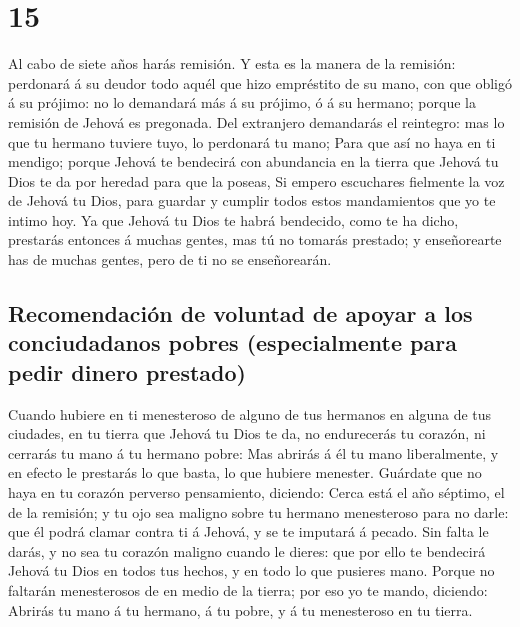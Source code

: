 \hypertarget{section-14}{%
\section{15}\label{section-14}}

 Al cabo de siete años harás remisión.  Y
esta es la manera de la remisión: perdonará á su deudor todo aquél que
hizo empréstito de su mano, con que obligó á su prójimo: no lo demandará
más á su prójimo, ó á su hermano; porque la remisión de Jehová es
pregonada.  Del extranjero demandarás el reintegro: mas lo
que tu hermano tuviere tuyo, lo perdonará tu mano;  Para
que así no haya en ti mendigo; porque Jehová te bendecirá con abundancia
en la tierra que Jehová tu Dios te da por heredad para que la poseas,
 Si empero escuchares fielmente la voz de Jehová tu Dios,
para guardar y cumplir todos estos mandamientos que yo te intimo hoy.
 Ya que Jehová tu Dios te habrá bendecido, como te ha
dicho, prestarás entonces á muchas gentes, mas tú no tomarás prestado; y
enseñorearte has de muchas gentes, pero de ti no se enseñorearán.

\hypertarget{recomendaciuxf3n-de-voluntad-de-apoyar-a-los-conciudadanos-pobres-especialmente-para-pedir-dinero-prestado}{%
\subsection{Recomendación de voluntad de apoyar a los conciudadanos
pobres (especialmente para pedir dinero
prestado)}\label{recomendaciuxf3n-de-voluntad-de-apoyar-a-los-conciudadanos-pobres-especialmente-para-pedir-dinero-prestado}}

 Cuando hubiere en ti menesteroso de alguno de tus
hermanos en alguna de tus ciudades, en tu tierra que Jehová tu Dios te
da, no endurecerás tu corazón, ni cerrarás tu mano á tu hermano pobre:
 Mas abrirás á él tu mano liberalmente, y en efecto le
prestarás lo que basta, lo que hubiere menester.  Guárdate
que no haya en tu corazón perverso pensamiento, diciendo: Cerca está el
año séptimo, el de la remisión; y tu ojo sea maligno sobre tu hermano
menesteroso para no darle: que él podrá clamar contra ti á Jehová, y se
te imputará á pecado.  Sin falta le darás, y no sea tu
corazón maligno cuando le dieres: que por ello te bendecirá Jehová tu
Dios en todos tus hechos, y en todo lo que pusieres mano.
 Porque no faltarán menesterosos de en medio de la
tierra; por eso yo te mando, diciendo: Abrirás tu mano á tu hermano, á
tu pobre, y á tu menesteroso en tu tierra.

